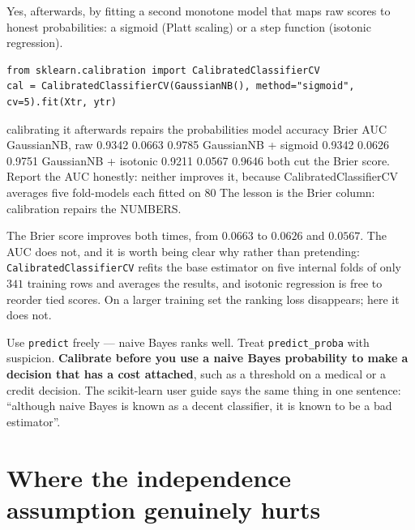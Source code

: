 \documentclass[11pt]{article}
\begin{document}
Yes, afterwards, by fitting a second monotone model that maps raw scores to
honest probabilities: a sigmoid (Platt scaling) or a step function
(isotonic regression).

\begin{lstlisting}
from sklearn.calibration import CalibratedClassifierCV
cal = CalibratedClassifierCV(GaussianNB(), method="sigmoid", cv=5).fit(Xtr, ytr)
\end{lstlisting}
\begin{codeout}
calibrating it afterwards repairs the probabilities
   model                               accuracy    Brier      AUC
   GaussianNB, raw                       0.9342   0.0663   0.9785
   GaussianNB + sigmoid                  0.9342   0.0626   0.9751
   GaussianNB + isotonic                 0.9211   0.0567   0.9646
   both cut the Brier score. Report the AUC honestly: neither improves
   it, because CalibratedClassifierCV averages five fold-models each
   fitted on 80%
   The lesson is the Brier column: calibration repairs the NUMBERS.
\end{codeout}

The Brier score improves both times, from $0.0663$ to $0.0626$ and $0.0567$.
The AUC does not, and it is worth being clear why rather than pretending:
\texttt{CalibratedClassifierCV} refits the base estimator on five internal
folds of only $341$ training rows and averages the results, and isotonic
regression is free to reorder tied scores. On a larger training set the
ranking loss disappears; here it does not.

\begin{caution}
Use \texttt{predict} freely --- naive Bayes ranks well. Treat
\texttt{predict\_proba} with suspicion. \textbf{Calibrate before you use a
naive Bayes probability to make a decision that has a cost attached}, such
as a threshold on a medical or a credit decision. The scikit-learn user
guide says the same thing in one sentence: ``although naive Bayes is known
as a decent classifier, it is known to be a bad estimator''.
\end{caution}

\section{Where the independence assumption genuinely hurts}
\label{sec:hurts}
\end{document}
